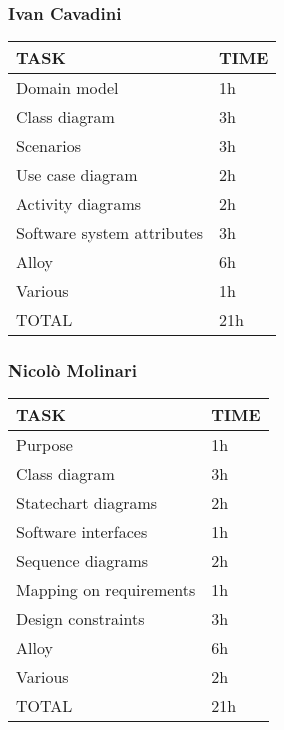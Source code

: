 
\hfill
\subsubsection{Ivan Cavadini}
\hfill
\begin{center}
	\begin{tabular}{ | l | p{6cm} | } 
		\hline
		TASK & TIME \\ 
		\hline
		Domain model & 1h  \\ 
		\hline
		Class diagram & 3h  \\ 
		\hline
		Scenarios & 3h \\ 
		\hline
		Use case diagram & 2h \\ 
		\hline
		Activity diagrams & 2h \\ 
		\hline
		Software system attributes & 3h \\ 
		\hline
		Alloy & 6h   \\ 
		\hline
		Various & 1h  \\ 
		\hline
		TOTAL & 21h \\ 
		\hline
	\end{tabular}
\end{center}
\hfill
\subsubsection{Nicolò Molinari}
\hfill
\begin{center}
	\begin{tabular}{ | l | p{6cm} | } 
		\hline
		TASK & TIME \\ 
		\hline
		Purpose & 1h  \\ 
		\hline
		Class diagram & 3h  \\ 
		\hline
		Statechart diagrams & 2h \\ 
		\hline
		Software interfaces & 1h \\ 
		\hline
		Sequence diagrams & 2h \\ 
		\hline
		Mapping on requirements & 1h   \\ 
		\hline
		Design constraints & 3h  \\ 
		\hline
		Alloy & 6h \\ 
		\hline
		Various & 2h \\ 
		\hline
		TOTAL & 21h \\ 
		\hline
	\end{tabular}
\end{center}
\hfill
